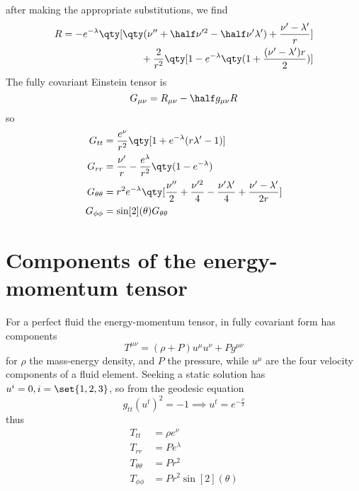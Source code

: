 after making the appropriate substitutions, we find
\begin{equation}
  \label{eq:205}
  \begin{split}
    R = - e^{-\lambda} \qty[ \qty( \nu'' + \half \nu'^2 - \half \nu' \lambda' ) + \frac{\nu' - \lambda'}{r}]\\
{}+\frac{2}{r^2} \qty[1 - e^{- \lambda} \qty( 1+ \frac{(\nu' - \lambda')r}{2})]
  \end{split}
\end{equation}
The fully covariant Einstein tensor is
\[ G_{\mu \nu} = R_{\mu \nu} - \half g_{\mu \nu} R \]
so
\begin{subequations}
  \begin{align}
    G_{tt} &= \frac{e^{\nu}}{r^2} \qty[ 1+ e^{-\lambda} (r \lambda' -1) ] \\
G_{rr} &= \frac{\nu'}{r} - \frac{e^{\lambda}}{r^2} \qty( 1 - e^{- \lambda}) \\
G_{\theta \theta} &= r^2 e^{- \lambda} \qty[ \frac{\nu''}{2} + \frac{\nu'^2}{4} - \frac{\nu' \lambda'}{4} + \frac{\nu'-\lambda'}{2r}] \\
G_{\phi \phi} &= \sin[2](\theta) G_{\theta \theta}
  \end{align}
\end{subequations}

\section{Components of the energy-momentum tensor}
\label{sec:comp-energy-moment}

For a perfect fluid the energy-momentum tensor, in fully covariant
form has components
\[ T^{\mu \nu} = (\rho + P) u^{\mu} u^{\nu} + P g^{\mu \nu} \] for
$\rho$ the mass-energy density, and $P$ the pressure, while $u^{\mu}$
are the four velocity components of a fluid element. Seeking a static
solution has $u^{i} = 0, i = \set{1,2,3}$, so from the geodesic
equation
\begin{equation}
  \label{eq:206}
  g_{tt}(u^t)^2 = -1 \implies u^t = e^{- \frac{\nu}{2}}
\end{equation}
thus
\begin{subequations}
  \begin{align}
    T_{tt} &= \rho e^{\nu} \\
T_{rr} &= P e^{\lambda} \\
T_{\theta \theta} &= P r^2 \\
T_{\phi \phi} &= P r^2 \sin[2](\theta)
  \end{align}
\end{subequations}

